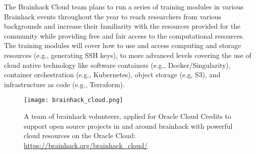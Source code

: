 \documentclass[../main.tex]{subfiles}
\begin{document}
The Brainhack Cloud team plans to run a series of training modules in various Brainhack events throughout the year to reach researchers from various backgrounds and increase their familiarity with the resources provided for the community while providing free and fair access to the computational resources. The training modules will cover how to use and access computing and storage resources (e.g., generating SSH keys), to more advanced levels covering the use of cloud native technology like software containers (e.g., Docker/Singularity), container orchestration (e.g., Kubernetes), object storage (e.g, S3), and infrastructure as code (e.g., Terraform).

\begin{figure}
    \centering
    \texttt{[image: brainhack\_cloud.png]}
    \caption{A team of brainhack volunteers, applied for Oracle Cloud Credits to support open source projects in and around brainhack with powerful cloud resources on the Oracle Cloud: \url{https://brainhack.org/brainhack_cloud/}
    }
    \label{fig:cloud}
\end{figure}


\end{document}
